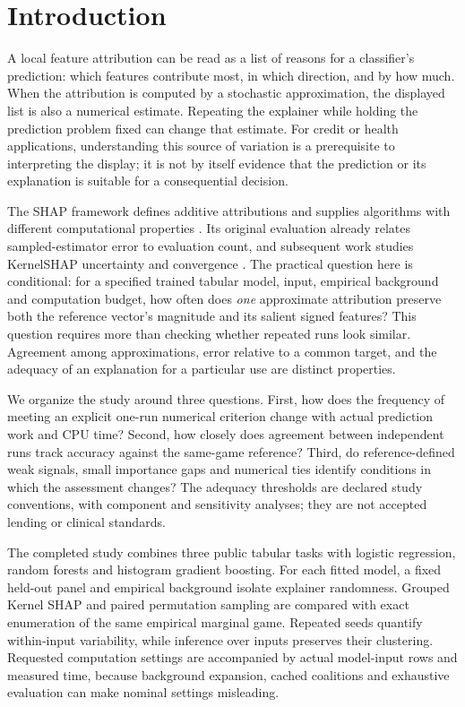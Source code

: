 \section{Introduction}
\label{sec:introduction}

A local feature attribution can be read as a list of reasons for a classifier's prediction: which features contribute most, in which direction, and by how much. When the attribution is computed by a stochastic approximation, the displayed list is also a numerical estimate. Repeating the explainer while holding the prediction problem fixed can change that estimate. For credit or health applications, understanding this source of variation is a prerequisite to interpreting the display; it is not by itself evidence that the prediction or its explanation is suitable for a consequential decision.

The SHAP framework defines additive attributions and supplies algorithms with different computational properties \citep{lundberg2017unified}. Its original evaluation already relates sampled-estimator error to evaluation count, and subsequent work studies KernelSHAP uncertainty and convergence \citep{covert2021improving}. The practical question here is conditional: for a specified trained tabular model, input, empirical background and computation budget, how often does \emph{one} approximate attribution preserve both the reference vector's magnitude and its salient signed features? This question requires more than checking whether repeated runs look similar. Agreement among approximations, error relative to a common target, and the adequacy of an explanation for a particular use are distinct properties.

We organize the study around three questions. First, how does the frequency of meeting an explicit one-run numerical criterion change with actual prediction work and CPU time? Second, how closely does agreement between independent runs track accuracy against the same-game reference? Third, do reference-defined weak signals, small importance gaps and numerical ties identify conditions in which the assessment changes? The adequacy thresholds are declared study conventions, with component and sensitivity analyses; they are not accepted lending or clinical standards.

The completed study combines three public tabular tasks with logistic regression, random forests and histogram gradient boosting. For each fitted model, a fixed held-out panel and empirical background isolate explainer randomness. Grouped Kernel SHAP and paired permutation sampling are compared with exact enumeration of the same empirical marginal game. Repeated seeds quantify within-input variability, while inference over inputs preserves their clustering. Requested computation settings are accompanied by actual model-input rows and measured time, because background expansion, cached coalitions and exhaustive evaluation can make nominal settings misleading.


